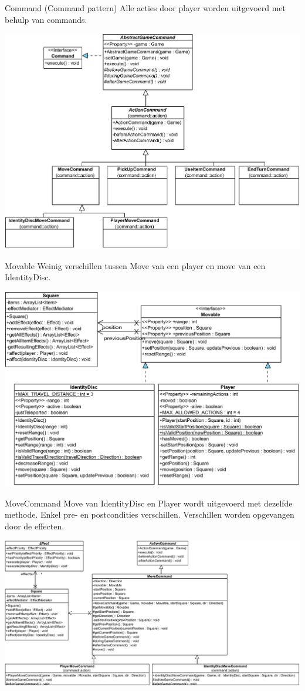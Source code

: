 \documentclass[11pt,t]{beamer}
\begin{document}
\begin{frame}{Command (Command pattern)}
Alle acties door player worden uitgevoerd met behulp van commands.
\begin{center}
\includegraphics[width=0.7\linewidth]{images/command}
\end{center}
\end{frame}

\begin{frame}{Movable}
Weinig verschillen tussen Move van een player en move van een IdentityDisc.
\begin{center}
\includegraphics[width=0.8\linewidth]{images/movable}
\end{center}
\end{frame}

\begin{frame}{MoveCommand}
Move van IdentityDisc en Player wordt uitgevoerd met dezelfde methode. Enkel pre- en postcondities verschillen. Verschillen worden opgevangen door de effecten.
\begin{center}
\includegraphics[width=0.95\linewidth]{images/movecommand}
\end{center}
\end{frame}
\end{document}
